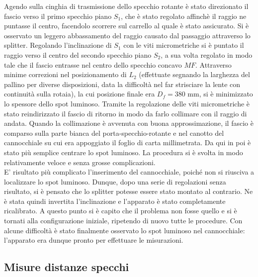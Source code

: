 \documentclass{article}
\begin{document}
            Agendo sulla cinghia di trasmissione dello specchio rotante è stato direzionato il fascio verso il primo specchio piano $S_1$, 
            che è stato regolato affinchè il raggio ne puntasse il centro, facendolo scorrere sul carrello al quale è stato assicurato. 
            Si è osservato un leggero abbassamento del raggio causato dal passaggio attraverso lo splitter. 
            Regolando l'inclinazione di $S_1$ con le viti micrometriche si è puntato il raggio verso il centro del secondo specchio piano $S_2$, 
            a sua volta regolato in modo tale che il fascio entrasse nel centro dello specchio concavo $MF$. 
            Attraverso minime correzioni nel posizionamento di $L_2$ (effettuate segnando la larghezza del pallino per diverse disposizioni, 
            data la difficoltà nel far strisciare la lente con continuità sulla rotaia), la cui posizione finale era $D_f=380$ mm, 
            si è minimizzato lo spessore dello spot luminoso. Tramite la regolazione delle viti micrometriche è stato reindirizzato il fascio di ritorno 
            in modo da farlo collimare con il raggio di andata. 
            Quando la collimazione è avvenuta con buona approssimazione, il fascio è comparso sulla parte bianca del porta-specchio-rotante e 
            nel canotto del cannocchiale su cui era appoggiato il foglio di carta millimetrata. Da qui in poi è stato più semplice centrare lo spot luminoso. 
            La procedura si è svolta in modo relativamente veloce e senza grosse complicazioni.\\
            
            E' risultato più complicato l'inserimento del cannocchiale, poiché non si riusciva a localizzare lo spot luminoso. 
            Dunque, dopo una serie  di regolazioni senza risultato, si è pensato che lo splitter potesse essere stato montato al contrario. 
            Ne è stata quindi invertita l'inclinazione e l'apparato è stato completamente ricalibrato. 
            A questo punto si è capito che il problema non fosse quello e si è tornati alla configurazione iniziale, ripetendo di nuovo tutte le procedure. 
            Con alcune difficoltà è stato finalmente osservato lo spot luminoso nel cannocchiale: l'apparato era dunque pronto per effettuare le misurazioni. 
        

        \subsection{Misure distanze specchi}
\end{document}
